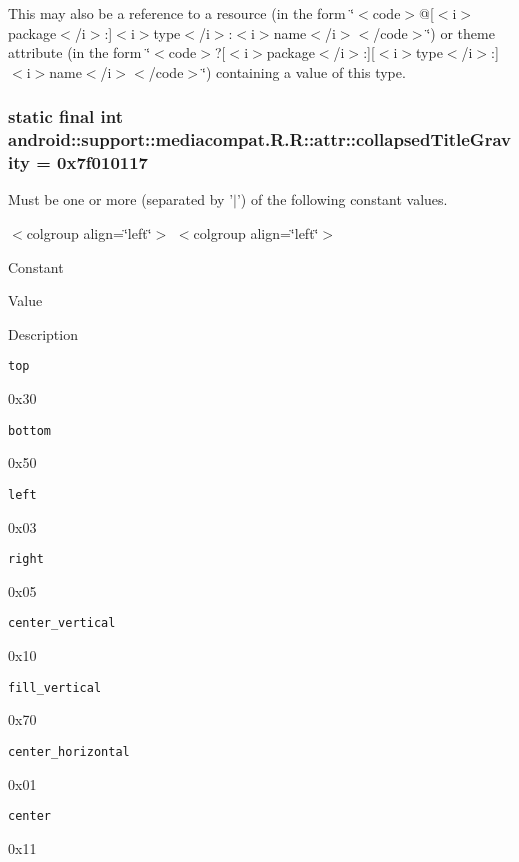 This may also be a reference to a resource (in the form \char`\"{}$<$code$>$@\mbox{[}$<$i$>$package$<$/i$>$:\mbox{]}$<$i$>$type$<$/i$>$:$<$i$>$name$<$/i$>$$<$/code$>$\char`\"{}) or theme attribute (in the form \char`\"{}$<$code$>$?\mbox{[}$<$i$>$package$<$/i$>$:\mbox{]}\mbox{[}$<$i$>$type$<$/i$>$:\mbox{]}$<$i$>$name$<$/i$>$$<$/code$>$\char`\"{}) containing a value of this type. \hypertarget{classandroid_1_1support_1_1mediacompat_1_1_r_1_1attr_4b24edb03aa3eaf00c03d2ebc33a7c81}{
\subsubsection[{collapsedTitleGravity}]{\setlength{\rightskip}{0pt plus 5cm}static final int android::support::mediacompat.R.R::attr::collapsedTitleGravity = 0x7f010117}}
\label{classandroid_1_1support_1_1mediacompat_1_1_r_1_1attr_4b24edb03aa3eaf00c03d2ebc33a7c81}


Must be one or more (separated by '$|$') of the following constant values. \begin{TabularC}{0}
\hline
\end{TabularC}
$<$colgroup align=\char`\"{}left\char`\"{}$>$ $<$colgroup align=\char`\"{}left\char`\"{}$>$ 

Constant

Value

Description 

{\tt top}

0x30

{\tt bottom}

0x50

{\tt left}

0x03

{\tt right}

0x05

{\tt center\_\-vertical}

0x10

{\tt fill\_\-vertical}

0x70

{\tt center\_\-horizontal}

0x01

{\tt center}

0x11

